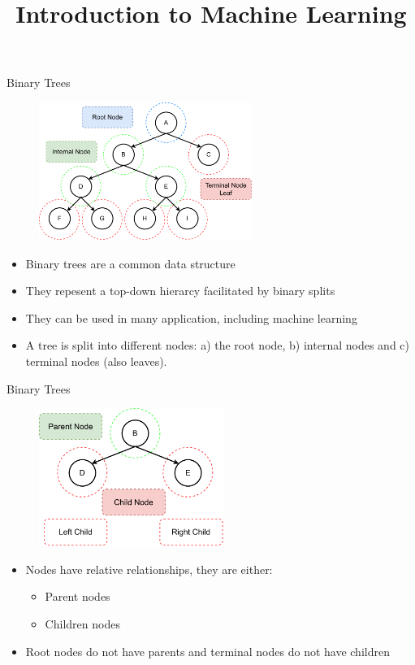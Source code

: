 \documentclass[11pt,compress,t,notes=noshow, xcolor=table]{beamer}
\title{Introduction to Machine Learning}
\institute{\href{https://compstat-lmu.github.io/lecture_i2ml/}{compstat-lmu.github.io/lecture\_i2ml}}
\date{}
\begin{document}
\sloppy

\begin{vbframe}{Binary Trees}
    \begin{figure}
    \centering
      \includegraphics[height = 4.5cm, keepaspectratio]{figure/cart_intro_binary-tree_1.pdf}
    \end{figure}
  \begin{itemize}
    \item Binary trees are a common data structure
    \item They repesent a top-down hierarcy facilitated by binary splits
    \item They can be used in many application, including machine learning
    \item A tree is split into different nodes: a) the root node, b) internal nodes and c) terminal nodes (also leaves).
  \end{itemize}
\end{vbframe}

\begin{vbframe}{Binary Trees}
    \begin{figure}
    \centering
      \includegraphics[height = 4.5cm, keepaspectratio]{figure/cart_intro_binary-tree_2.pdf}
    \end{figure}
  \begin{itemize}
    \item Nodes have relative relationships, they are either:
    \begin{itemize}
    \item Parent nodes
    \item Children nodes
    \end{itemize}
    \item Root nodes do not have parents and terminal nodes do not have children
  \end{itemize}
\end{vbframe}
\end{document}
